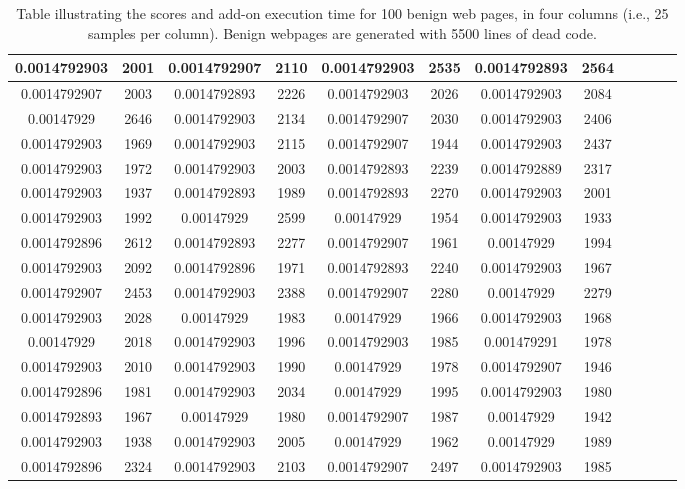 \begin{table}[h]
\begin{tabular}{|c|c|c|c|c|c|c|c|c|c|c|c|}
\midrule
0.0014792903&2001&0.0014792907&2110&0.0014792903&2535&0.0014792893&2564\\
\midrule
0.0014792907&2003&0.0014792893&2226&0.0014792903&2026&0.0014792903&2084\\
\midrule
0.00147929&2646&0.0014792903&2134&0.0014792907&2030&0.0014792903&2406\\
\midrule
0.0014792903&1969&0.0014792903&2115&0.0014792907&1944&0.0014792903&2437\\
\midrule
0.0014792903&1972&0.0014792903&2003&0.0014792893&2239&0.0014792889&2317\\
\midrule
0.0014792903&1937&0.0014792893&1989&0.0014792893&2270&0.0014792903&2001\\
\midrule
0.0014792903&1992&0.00147929&2599&0.00147929&1954&0.0014792903&1933\\
\midrule
0.0014792896&2612&0.0014792893&2277&0.0014792907&1961&0.00147929&1994\\
\midrule
0.0014792903&2092&0.0014792896&1971&0.0014792893&2240&0.0014792903&1967\\
\midrule
0.0014792907&2453&0.0014792903&2388&0.0014792907&2280&0.00147929&2279\\
\midrule
0.0014792903&2028&0.00147929&1983&0.00147929&1966&0.0014792903&1968\\
\midrule
0.00147929&2018&0.0014792903&1996&0.0014792903&1985&0.001479291&1978\\
\midrule
0.0014792903&2010&0.0014792903&1990&0.00147929&1978&0.0014792907&1946\\
\midrule
0.0014792896&1981&0.0014792903&2034&0.00147929&1995&0.0014792903&1980\\
\midrule
0.0014792893&1967&0.00147929&1980&0.0014792907&1987&0.00147929&1942\\
\midrule
0.0014792903&1938&0.0014792903&2005&0.00147929&1962&0.00147929&1989\\
\midrule
0.0014792896&2324&0.0014792903&2103&0.0014792907&2497&0.0014792903&1985\\
\midrule
\end{tabular}
     \caption[Scores table of benign web pages]{Table illustrating the scores and add-on execution time for 100 benign web pages, in four columns (i.e., 25 samples per column). Benign webpages are generated with 5500 lines of dead code.} \label{tab:b5500table}
     
\end{table}
